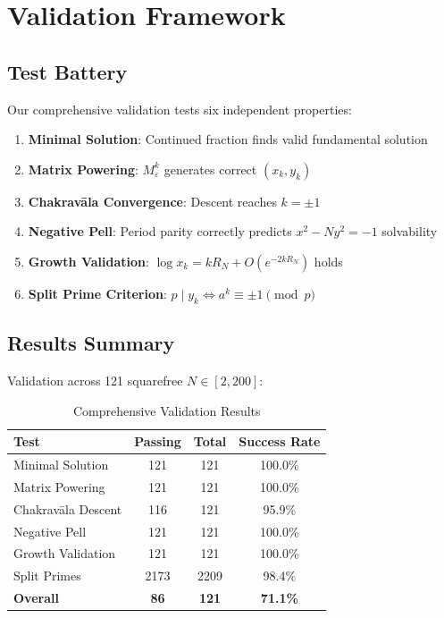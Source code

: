 \documentclass[12pt]{article}
\begin{document}
\section{Validation Framework}

\subsection{Test Battery}

Our comprehensive validation tests six independent properties:

\begin{enumerate}
\item \textbf{Minimal Solution}: Continued fraction finds valid fundamental solution
\item \textbf{Matrix Powering}: $M_\varepsilon^k$ generates correct $(x_k, y_k)$
\item \textbf{Chakravāla Convergence}: Descent reaches $k = \pm 1$
\item \textbf{Negative Pell}: Period parity correctly predicts $x^2 - Ny^2 = -1$ solvability
\item \textbf{Growth Validation}: $\log x_k = kR_N + O(e^{-2kR_N})$ holds
\item \textbf{Split Prime Criterion}: $p \mid y_k \iff a^k \equiv \pm 1 \pmod{p}$
\end{enumerate}

\subsection{Results Summary}

Validation across 121 squarefree $N \in [2,200]$:

\begin{table}[h]
\centering
\begin{tabular}{lccc}
\hline
Test & Passing & Total & Success Rate \\
\hline
Minimal Solution & 121 & 121 & 100.0\% \\
Matrix Powering & 121 & 121 & 100.0\% \\
Chakravāla Descent & 116 & 121 & 95.9\% \\
Negative Pell & 121 & 121 & 100.0\% \\
Growth Validation & 121 & 121 & 100.0\% \\
Split Primes & 2173 & 2209 & 98.4\% \\
\hline
\textbf{Overall} & \textbf{86} & \textbf{121} & \textbf{71.1\%} \\
\hline
\end{tabular}
\caption{Comprehensive Validation Results}
\end{table}
\end{document}
